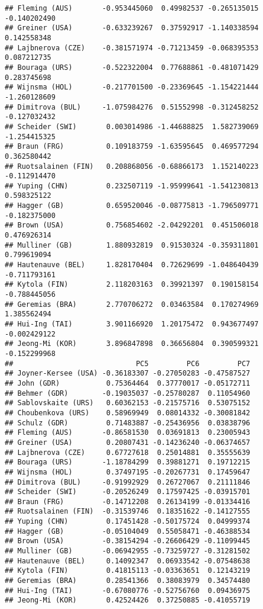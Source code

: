 \documentclass[]{article}
\numberwithin{equation}{section}
\begin{document}
\begin{verbatim}
## Fleming (AUS)       -0.953445060  0.49982537 -0.265135015 -0.140202490
## Greiner (USA)       -0.633239267  0.37592917 -1.140338594  0.142558348
## Lajbnerova (CZE)    -0.381571974 -0.71213459 -0.068395353  0.087212735
## Bouraga (URS)       -0.522322004  0.77688861 -0.481071429  0.283745698
## Wijnsma (HOL)       -0.217701500 -0.23369645 -1.154221444 -1.260128609
## Dimitrova (BUL)     -1.075984276  0.51552998 -0.312458252 -0.127032432
## Scheider (SWI)       0.003014986 -1.44688825  1.582739069 -1.254415325
## Braun (FRG)          0.109183759 -1.63595645  0.469577294  0.362580442
## Ruotsalainen (FIN)   0.208868056 -0.68866173  1.152140223 -0.112914470
## Yuping (CHN)         0.232507119 -1.95999641 -1.541230813  0.598325122
## Hagger (GB)          0.659520046 -0.08775813 -1.796509771 -0.182375000
## Brown (USA)          0.756854602 -2.04292201  0.451506018  0.476926314
## Mulliner (GB)        1.880932819  0.91530324 -0.359311801  0.799619094
## Hautenauve (BEL)     1.828170404  0.72629699 -1.048640439 -0.711793161
## Kytola (FIN)         2.118203163  0.39921397  0.190158154 -0.788445056
## Geremias (BRA)       2.770706272  0.03463584  0.170274969  1.385562494
## Hui-Ing (TAI)        3.901166920  1.20175472  0.943677497 -0.002429122
## Jeong-Mi (KOR)       3.896847898  0.36656804  0.390599321 -0.152299968
##                             PC5         PC6         PC7
## Joyner-Kersee (USA) -0.36183307 -0.27050283 -0.47587527
## John (GDR)           0.75364464  0.37770017 -0.05172711
## Behmer (GDR)        -0.19035037 -0.25780287  0.11054960
## Sablovskaite (URS)   0.60362153 -0.21575716  0.53075152
## Choubenkova (URS)    0.58969949  0.08014332 -0.30081842
## Schulz (GDR)         0.71483887 -0.25436956  0.03838796
## Fleming (AUS)       -0.86581530  0.03691813  0.23005943
## Greiner (USA)        0.20807431 -0.14236240 -0.06374657
## Lajbnerova (CZE)     0.67727618  0.25014881  0.35555639
## Bouraga (URS)       -1.18784299  0.39881271  0.19712215
## Wijnsma (HOL)        0.37497195 -0.20267731  0.17459647
## Dimitrova (BUL)     -0.91992929  0.26727067  0.21111846
## Scheider (SWI)      -0.20526249  0.17597425 -0.03915701
## Braun (FRG)         -0.14712208  0.26134199 -0.01334416
## Ruotsalainen (FIN)  -0.31539746  0.18351622 -0.14127555
## Yuping (CHN)         0.17451428 -0.50175724  0.04999374
## Hagger (GB)         -0.05104049  0.55058471 -0.46388534
## Brown (USA)         -0.38154294 -0.26606429 -0.11099445
## Mulliner (GB)       -0.06942955 -0.73259727 -0.31281502
## Hautenauve (BEL)     0.14092347  0.06933542 -0.07548638
## Kytola (FIN)         0.41815113 -0.03363651  0.12143219
## Geremias (BRA)       0.28541366  0.38083979  0.34574480
## Hui-Ing (TAI)       -0.67080776 -0.52756760  0.09436975
## Jeong-Mi (KOR)       0.42524426  0.37250885 -0.41055719
\end{verbatim}
\end{document}
